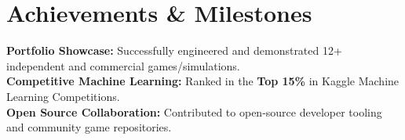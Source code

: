 \documentclass[letterpaper,10.8pt]{article}
\begin{document}
\section{Achievements \& Milestones}
 \begin{itemize}[leftmargin=0.15in, label={}]
    \small{\item{
     \textbf{Portfolio Showcase:}{ Successfully engineered and demonstrated 12+ independent and commercial games/simulations.} \\
     \textbf{Competitive Machine Learning:}{ Ranked in the \textbf{Top 15\%} in Kaggle Machine Learning Competitions.} \\
     \textbf{Open Source Collaboration:}{ Contributed to open-source developer tooling and community game repositories.}
    }}
 \end{itemize}

\end{document}
